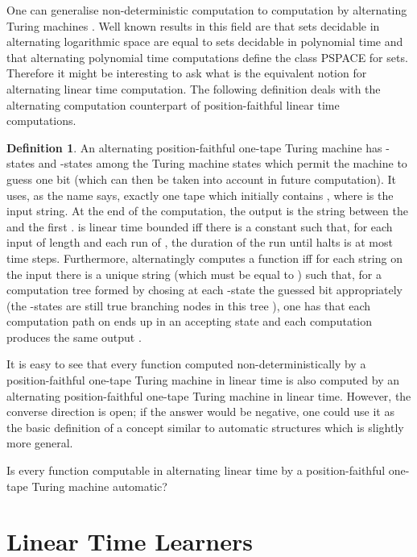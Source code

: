 \documentclass{LMCS}
\theoremstyle{plain}\newtheorem{athm}[thm]{Theorem}
\theoremstyle{plain}\newtheorem{aprop}[thm]{Proposition}
\theoremstyle{plain}\newtheorem{aprob}[thm]{Open Problem}
\theoremstyle{plain}\newtheorem{acor}[thm]{Corollary}
\theoremstyle{plain}\newtheorem{alem}[thm]{Lemma}
\theoremstyle{definition}\newtheorem{adefn}[thm]{Definition}
\theoremstyle{definition}\newtheorem{arem}[thm]{Remark}
\theoremstyle{plain}\newtheorem{aexmp}[thm]{Example}
\theoremstyle{plain}\newtheorem{aclm}[thm]{Claim}
\begin{document}
\noindent
One can generalise non-deterministic computation to computation
by alternating Turing machines \cite{CKS81}.
Well known results in this field \cite{CKS81}
are that sets decidable in alternating logarithmic space are equal
to sets decidable in polynomial time and
that alternating polynomial time computations define the class
PSPACE for sets. Therefore it might be interesting
to ask what is the equivalent notion for alternating linear time computation.
The following definition deals with the
alternating computation counterpart of position-faithful linear
time computations.

\begin{adefn} \rm
An alternating position-faithful one-tape Turing machine  has
-states and -states among the Turing machine 
states which permit the machine to guess one bit (which can then
be taken into account in future computation).
It uses, as the name says, exactly one tape which initially
contains , where  is the input string.
At the end of the computation, the output is the string 
between the  and the first .
 is linear time bounded iff there is a constant  such that, for
each input  of length  and each run of , the duration of
the run until  halts is at most  time steps.
Furthermore,  alternatingly computes a function 
iff for each string  on the input there is a unique string  
(which must be equal to ) such that,
for a computation tree  formed by chosing at each -state
the guessed bit appropriately (the -states are still
true branching nodes in this tree ), one has that
each computation path on  ends up in an accepting state 
and each computation produces the same output .
\end{adefn}

\noindent
It is easy to see that every function  computed non-deterministically
by a position-faithful one-tape Turing machine in linear time
is also computed by an alternating position-faithful one-tape Turing
machine in linear time. However, the converse direction is open;
if the answer would be negative, one could use it as the basic definition
of a concept similar to automatic structures which is slightly more
general.

\begin{oprob}
Is every function  computable in alternating linear time
by a position-faithful one-tape Turing machine automatic?
\end{oprob}


\section{Linear Time Learners} \label{se:lintimelearn}
\end{document}
